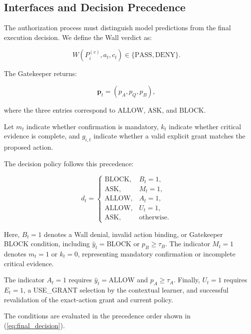 \documentclass[10pt,conference]{IEEEtran}
\newcommand{\Allow}{\ensuremath{\mathrm{ALLOW}}}
\newcommand{\Ask}{\ensuremath{\mathrm{ASK}}}
\newcommand{\Block}{\ensuremath{\mathrm{BLOCK}}}
\newcommand{\Pass}{\ensuremath{\mathrm{PASS}}}
\newcommand{\Deny}{\ensuremath{\mathrm{DENY}}}
\begin{document}

\subsection{Interfaces and Decision Precedence}
\label{sec:decision}

The authorization process must distinguish model predictions from the final execution decision. We define the Wall verdict as:

\begin{equation}
W(P_i^{(v)},a_t,c_t)\in\{\Pass,\Deny\}.
\end{equation}

The Gatekeeper returns:

\begin{equation}
\mathbf{p}_t =
(p_A,p_Q,p_B),
\end{equation}

where the three entries correspond to \Allow, \Ask, and \Block.

Let $m_t$ indicate whether confirmation is mandatory, $k_t$ indicate whether critical evidence is complete, and $g_{i,t}$ indicate whether a valid explicit grant matches the proposed action.

The decision policy follows this precedence:

\begin{equation}
d_t =
\begin{cases}
\Block, & B_t=1,\\
\Ask, & M_t=1,\\
\Allow, & A_t=1,\\
\Allow, & U_t=1,\\
\Ask, & \text{otherwise}.
\end{cases}
\label{eq:final_decision}
\end{equation}

Here, $B_t=1$ denotes a Wall denial, invalid
action binding, or Gatekeeper BLOCK condition,
including $\hat y_t=\Block$ or $p_B\geq\tau_B$.
The indicator $M_t=1$ denotes
$m_t=1$ or $k_t=0$, representing mandatory
confirmation or incomplete critical evidence.

The indicator $A_t=1$ requires
$\hat y_t=\Allow$ and $p_A\geq\tau_A$.
Finally, $U_t=1$ requires $E_t=1$,
a USE\_GRANT selection by the contextual
learner, and successful revalidation of
the exact-action grant and current policy.

The conditions are evaluated in the
precedence order shown in
(\ref{eq:final_decision}).
\end{document}
